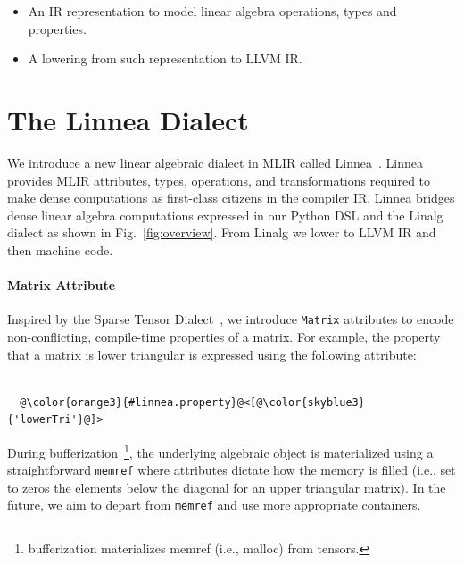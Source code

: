 \documentclass[conference]{IEEEtran}
\begin{document}
\begin{itemize}
	\item An IR representation to model linear algebra operations, types and properties.
	\item A lowering from such representation to LLVM IR.
\end{itemize}

\section{The Linnea Dialect}

We introduce a new linear algebraic dialect in MLIR called
Linnea~\cite{barthels:21}.  Linnea provides MLIR attributes, types, operations,
and transformations required to make dense computations as first-class citizens
in the compiler IR.  Linnea bridges dense linear algebra computations expressed
in our Python DSL and the Linalg dialect as shown in Fig.~\ref{fig:overview}.
From Linalg we lower to LLVM IR and then machine code.

\paragraph{Matrix Attribute}

Inspired by the Sparse Tensor Dialect~\cite{bik2022compiler}, we introduce \texttt{Matrix} attributes to
encode non-conflicting, compile-time properties of a matrix. For example, the
property that a matrix is lower triangular is expressed using the following
attribute:

\begin{verbatim}

  @\color{orange3}{#linnea.property}@<[@\color{skyblue3}{'lowerTri'}@]>

\end{verbatim}
During bufferization~\footnote{bufferization materializes memref (i.e., malloc)
from tensors.}, the underlying algebraic object is materialized using a
straightforward \texttt{memref} where attributes dictate how the memory is
filled (i.e., set to zeros the elements below the diagonal for an upper
triangular matrix). In the future, we aim to depart from \texttt{memref}
and use more appropriate containers.
\end{document}
